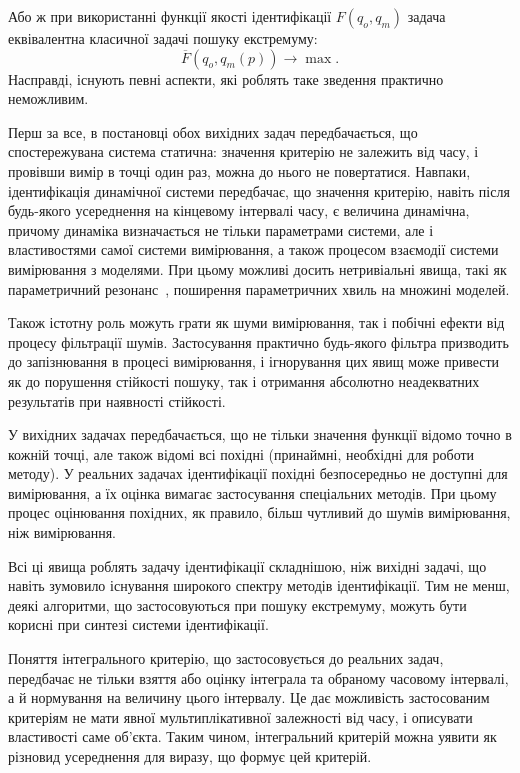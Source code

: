 Або ж при використанні функції якості ідентифікації
$ F (q_o, q_m) $ задача еквівалентна класичної задачі пошуку
екстремуму:
%
\[
  \overline{F}( q_o, q_m(p) ) \to \max.
\]
%
Насправді, існують певні аспекти, які роблять таке зведення практично
неможливим.

Перш за все, в постановці обох вихідних задач передбачається, що
спостережувана система статична: значення критерію не залежить від часу, і
провівши вимір в точці один раз, можна до нього не повертатися. Навпаки,
ідентифікація динамічної системи передбачає, що значення критерію, навіть після
будь-якого усереднення на кінцевому інтервалі часу, є величина динамічна,
причому динаміка визначається не тільки параметрами системи, але і
властивостями самої системи вимірювання, а також процесом взаємодії системи
вимірювання з моделями. При цьому можливі досить нетривіальні явища, такі як
параметричний резонанс~\cite{landau1}, поширення параметричних хвиль на множині моделей.

Також істотну роль можуть грати як шуми вимірювання, так і
побічні ефекти від процесу фільтрації шумів. Застосування
практично будь-якого фільтра призводить до запізнювання в
процесі вимірювання, і ігнорування цих явищ може привести
як до порушення стійкості пошуку, так і отримання абсолютно
неадекватних результатів при наявності стійкості.

У вихідних задачах передбачається, що не тільки значення
функції відомо точно в кожній точці, але також відомі всі
похідні (принаймні, необхідні для роботи методу). У реальних
задачах ідентифікації похідні безпосередньо не доступні для
вимірювання, а їх оцінка вимагає застосування спеціальних
методів. При цьому процес оцінювання похідних, як правило,
більш чутливий до шумів вимірювання, ніж вимірювання.




Всі ці явища роблять задачу ідентифікації складнішою, ніж
вихідні задачі, що навіть зумовило існування широкого
спектру методів ідентифікації. Тим не менш, деякі алгоритми,
що застосовуються при пошуку екстремуму, можуть бути корисні
при синтезі системи ідентифікації.


Поняття інтегрального критерію, що застосовується до реальних задач, передбачає
не тільки взяття або оцінку інтеграла та обраному часовому
інтервалі, а й нормування на величину цього інтервалу. Це дає можливість
застосованим критеріям не мати явної мультиплікативної залежності від часу, і
описувати властивості саме об'єкта. Таким чином, інтегральний критерій можна
уявити як різновид усереднення для виразу, що формує цей критерій.

